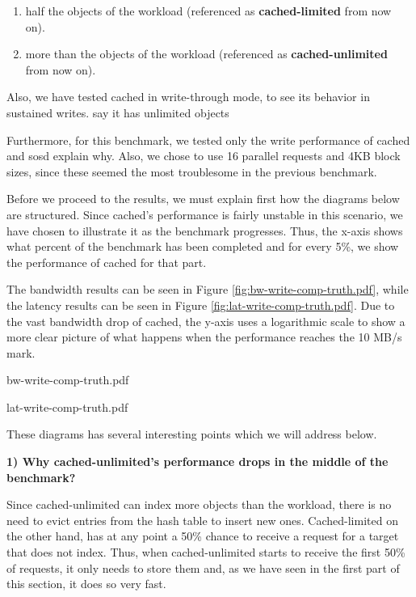 \begin{enumerate}
	\item half the objects of the workload (referenced as 
		\textbf{cached-limited} from now on).
	\item more than the objects of the workload (referenced as 
		\textbf{cached-unlimited} from now on).
\end{enumerate}

Also, we have tested cached in write-through mode, to see its behavior in 
sustained writes. \fixme say it has unlimited objects 

Furthermore, for this benchmark, we tested only the write performance of cached 
and sosd \fixme explain why.  Also, we chose to use 16 parallel requests and 
4KB block sizes, since these seemed the most troublesome in the previous 
benchmark.

Before we proceed to the results, we must explain first how the diagrams below 
are structured. Since cached's performance is fairly unstable in this scenario, 
we have chosen to illustrate it as the benchmark progresses.  Thus, the x-axis 
shows what percent of the benchmark has been completed and for every 5\%, we 
show the performance of cached for that part.

The bandwidth results can be seen in Figure \ref{fig:bw-write-comp-truth.pdf}, 
while the latency results can be seen in Figure 
\ref{fig:lat-write-comp-truth.pdf}.  Due to the vast bandwidth drop of cached, 
the y-axis uses a logarithmic scale to show a more clear picture of what 
happens when the performance reaches the 10 MB/s mark.

{bw-write-comp-truth.pdf}

{lat-write-comp-truth.pdf}

These diagrams has several interesting points which we will address below.

\textbf{1) Why cached-unlimited's performance drops in the middle of the 
	benchmark?}

Since cached-unlimited can index more objects than the workload, there is no 
need to evict entries from the hash table to insert new ones. Cached-limited on 
the other hand, has at any point a 50\% chance to receive a request for a 
target that does not index. Thus, when cached-unlimited starts to receive the 
first 50\% of requests, it only needs to store them and, as we have seen in the 
first part of this section, it does so very fast.


